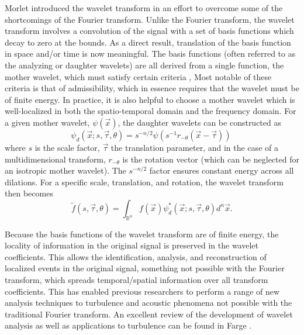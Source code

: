 Morlet \citep{Morlet1981} introduced the wavelet transform in an effort to overcome some of the shortcomings of the Fourier transform.
Unlike the Fourier transform, the wavelet transform involves a convolution of the signal with a set of basis functions which decay to zero at the bounds.
As a direct result, translation of the basis function in space and/or time is now meaningful. 
The basis functions (often referred to as the analyzing or daughter wavelets) are all derived from a single function, the mother wavelet, which must satisfy certain criteria \citep{Farge1992},
Most notable of these criteria is that of admissibility, which in essence requires that the wavelet must be of finite energy. 
In practice, it is also helpful to choose a mother wavelet which is well-localized in both the spatio-temporal domain and the frequency domain. 
For a given mother wavelet, $\psi (\vec{x})$, the daughter wavelets can be constructed as
\begin{equation}
	\psi_d \left( \vec{x};s,\vec{\tau},\theta \right) = s^{-n/2} \psi \left( s^{-1} r_{-\theta} \left(\vec{x}-\vec{\tau} \right) \right) \
	\label{eq:daughter_wavelets}
\end{equation}
where $s$ is the scale factor, $\vec{\tau}$ the translation parameter, and in the case of a multidimensional transform, $r_{-\theta}$ is the rotation vector (which can be neglected for an isotropic mother wavelet). 
The $s^{-n/2}$ factor ensures constant energy across all dilations. 
For a specific scale, translation, and rotation, the wavelet transform then becomes
\begin{equation}
	\tilde{f} \left( s, \vec{\tau}, \theta \right) = \int_{\mathbb{R}^n} f \left( \vec{x} \right) \psi^*_d \left( \vec{x};s,\vec{\tau},\theta \right) d^n \vec{x}.
\end{equation}

Because the basis functions of the wavelet transform are of finite energy, the locality of information in the original signal is preserved in the wavelet coefficients. 
This allows the identification, analysis, and reconstruction of localized events in the original signal, something not possible with the Fourier transform, which spreads temporal/spatial information over all transform coefficients. 
This has enabled previous researchers to perform a range of new analysis techniques to turbulence and acoustic phenomena not possible with the traditional Fourier transform. An excellent review of the development of wavelet analysis as well as applications to turbulence can be found in Farge \citep{Farge1992}.

